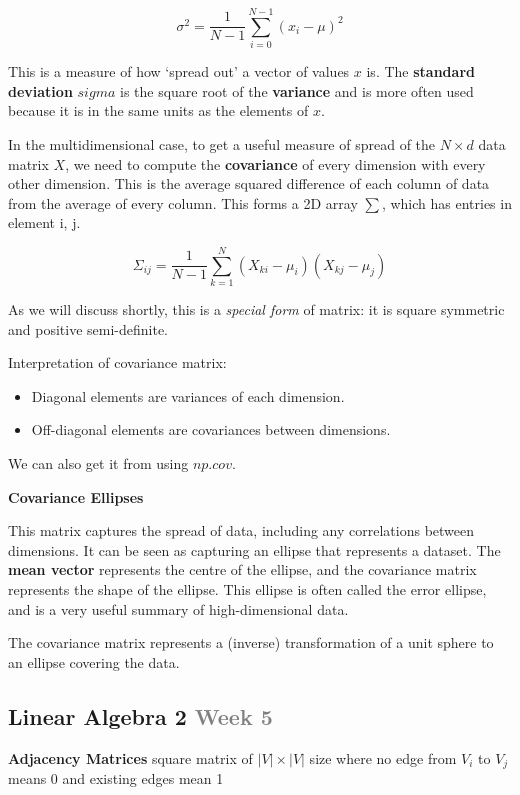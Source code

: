 \documentclass{article}
\begin{document}
\[\sigma^2 = \frac{1}{N - 1} \sum_{i=0}^{N-1} {(x_i - \mu)}^2\]

This is a measure of how `spread out' a vector of values $x$ is. The \textbf{standard deviation} $sigma$
is the square root of the \textbf{variance} and is more often used because it is in the same units as the
elements of $x$.

In the multidimensional case, to get a useful measure of spread of the $N \times d$ data matrix $X$, we need to
compute the \textbf{covariance} of every dimension with every other dimension. This is the average squared
difference of each column of data from the average of every column. This forms a 2D array $\sum$, which
has entries in element i, j.

\[\Sigma_{ij} = \frac{1}{N - 1} \sum_{k=1}^{N} (X_{ki} - \mu_i)(X_{kj} - \mu_j)\]

As we will discuss shortly, this is a \textit{special form} of matrix: it is square symmetric and positive
semi-definite.

Interpretation of covariance matrix:
\begin{itemize}
    \item Diagonal elements are variances of each dimension.
    \item Off-diagonal elements are covariances between dimensions.
\end{itemize}

We can also get it from using $np.cov$.

\textbf{Covariance Ellipses}

This matrix captures the spread of data, including any correlations between dimensions.
It can be seen as capturing an ellipse that represents a dataset. The \textbf{mean vector} represents
the centre of the ellipse, and the covariance matrix represents the shape of the ellipse.
This ellipse is often called the error ellipse, and is a very useful summary of high-dimensional data.

The covariance matrix represents a (inverse) transformation of a unit sphere to an ellipse covering the data.

\clearpage

\subsection*{Linear Algebra 2 \small\textcolor{gray}{Week 5}}

\textbf{Adjacency Matrices} square matrix of $|V| \times |V|$ size where no edge from $V_i$ to $V_j$ means 0 and existing edges mean 1
\end{document}
